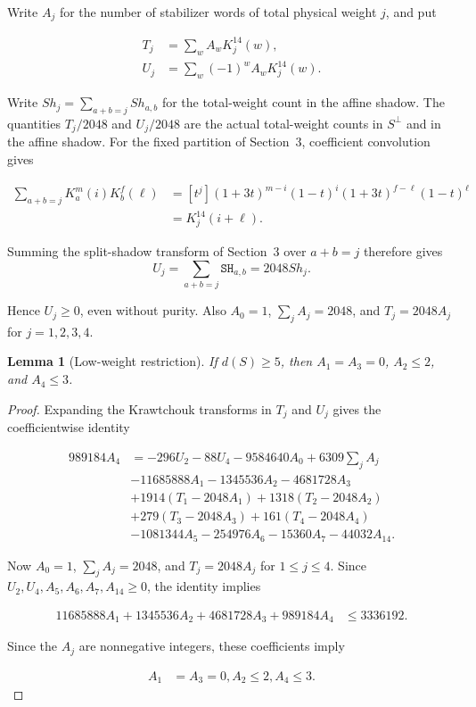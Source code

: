 \documentclass[11pt]{article}
\newtheorem{lemma}[theorem]{Lemma}
\begin{document}
Write \(A_{j}\) for the number of stabilizer words of total physical weight \(j\), and put

\[
\begin{aligned}
T_{j} &=\sum_{w} A_{w} K_{j}^{14}(w), \\
U_{j} &=\sum_{w} (-1)^{w} A_{w} K_{j}^{14}(w).
\end{aligned}
\]

Write \(Sh_j=\sum_{a+b=j}Sh_{a,b}\) for the total-weight count in the affine shadow. The quantities \(T_{j}/2048\) and \(U_{j}/2048\) are the actual total-weight counts in \(S^\perp\) and in the affine shadow. For the fixed partition of Section~3, coefficient convolution gives

\[
\begin{aligned}
\sum_{a+b=j}K_a^m(i)K_b^f(\ell)
&=[t^j](1+3t)^{m-i}(1-t)^i(1+3t)^{f-\ell}(1-t)^\ell\\
&=K_j^{14}(i+\ell).
\end{aligned}
\]

Summing the split-shadow transform of Section~3 over \(a+b=j\) therefore gives
\[
U_j=\sum_{a+b=j}\mathtt{SH}_{a,b}=2048Sh_j.
\]

Hence \(U_{j} \ge 0\), even without purity. Also \(A_{0}=1\), \(\sum_{j} A_{j}=2048\), and \(T_{j}=2048 A_{j}\) for \(j=1,2,3,4\).

\begin{lemma}[Low-weight restriction]\label{lem:low-weight}
If \(d(S)\geq5\), then \(A_1=A_3=0\), \(A_2\leq2\), and \(A_4\leq3\).
\end{lemma}
\begin{proof}

Expanding the Krawtchouk transforms in \(T_{j}\) and \(U_{j}\) gives the coefficientwise identity

\[
\begin{aligned}
989184 A_{4} &=-296 U_{2} -88 U_{4} -9584640 A_{0} +6309 \sum_{j} A_{j} \\
& -11685888 A_{1} -1345536 A_{2} -4681728 A_{3} \\
& +1914 (T_{1}-2048 A_{1}) +1318 (T_{2}-2048 A_{2}) \\
& +279 (T_{3}-2048 A_{3}) +161 (T_{4}-2048 A_{4}) \\
& -1081344 A_{5} -254976 A_{6} -15360 A_{7} -44032 A_{14}.
\end{aligned}
\]

Now \(A_0=1\), \(\sum_j A_j=2048\), and \(T_j=2048A_j\) for \(1\leq j\leq4\). Since \(U_2,U_4,A_5,A_6,A_7,A_{14}\geq0\), the identity implies

\[
\begin{aligned}
11685888 A_{1} +1345536 A_{2} +4681728 A_{3} +989184 A_{4}  &\le  3336192.
\end{aligned}
\]

Since the \(A_j\) are nonnegative integers, these coefficients imply

\[
\begin{aligned}
A_{1} &=A_{3} = 0,   A_{2}  \le  2,   A_{4}  \le  3.
\end{aligned}
\]

\end{proof}
\end{document}
